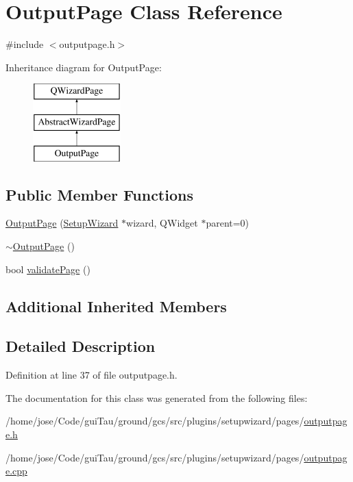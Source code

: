 \hypertarget{class_output_page}{\section{Output\-Page Class Reference}
\label{class_output_page}
}


{\ttfamily \#include $<$outputpage.\-h$>$}

Inheritance diagram for Output\-Page\-:\begin{figure}[H]
\begin{center}
\leavevmode
\includegraphics[height=3.000000cm]{class_output_page}
\end{center}
\end{figure}
\subsection*{Public Member Functions}
\begin{DoxyCompactItemize}
\item 
\hyperlink{group___output_page_ga49bfd1f39b52816cb9ea7f7befb32af1}{Output\-Page} (\hyperlink{class_setup_wizard}{Setup\-Wizard} $\ast$wizard, Q\-Widget $\ast$parent=0)
\item 
\hyperlink{group___output_page_ga475a6fbc3d6362b5b0030dd16b312855}{$\sim$\-Output\-Page} ()
\item 
bool \hyperlink{group___output_page_ga69997333a8bb3353d0c3f9394cc493b9}{validate\-Page} ()
\end{DoxyCompactItemize}
\subsection*{Additional Inherited Members}


\subsection{Detailed Description}


Definition at line 37 of file outputpage.\-h.



The documentation for this class was generated from the following files\-:\begin{DoxyCompactItemize}
\item 
/home/jose/\-Code/gui\-Tau/ground/gcs/src/plugins/setupwizard/pages/\hyperlink{outputpage_8h}{outputpage.\-h}\item 
/home/jose/\-Code/gui\-Tau/ground/gcs/src/plugins/setupwizard/pages/\hyperlink{outputpage_8cpp}{outputpage.\-cpp}\end{DoxyCompactItemize}
